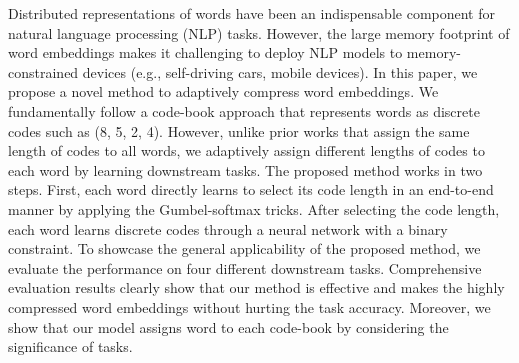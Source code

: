 Distributed representations of words have been an indispensable component for natural language processing (NLP) tasks. However, the large memory footprint of word embeddings makes it challenging to deploy NLP models to memory-constrained devices (e.g., self-driving cars, mobile devices). In this paper, we propose a novel method to adaptively compress word embeddings. We fundamentally follow a code-book approach that represents words as discrete codes such as (8, 5, 2, 4). However, unlike prior works that assign the same length of codes to all words, we adaptively assign different lengths of codes to each word by learning downstream tasks. The proposed method works in two steps. First, each word directly learns to select its code length in an end-to-end manner by applying the Gumbel-softmax tricks. After selecting the code length, each word learns discrete codes through a neural network with a binary constraint. To showcase the general applicability of the proposed method, we evaluate the performance on four different downstream tasks. Comprehensive evaluation results clearly show that our method is effective and makes the highly compressed word embeddings without hurting the task accuracy. Moreover, we show that our model assigns word to each code-book by considering the significance of tasks.
